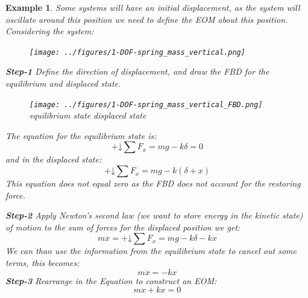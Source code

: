 \documentclass[12pt,letter]{article}
\newtheorem{ex}{Example}
\numberwithin{ex}{section} %
\newenvironment{example}{\begin{mdframed}[middlelinewidth=0.5mm]\begin{ex}\normalfont}{\end{ex}\end{mdframed}}
\numberwithin{re}{section} %
\numberwithin{vcs}{section} %
\newcommand*\downplus{%
  \mathbin{+\mathord\downarrow}}								%
\begin{document}
		\begin{example}	
			Some systems will have an initial displacement, as the system will oscillate around this position we need to define the EOM about this position. Considering the system:
			\begin{figure}[H]
				\centering
				\texttt{[image: ../figures/1-DOF-spring\_mass\_vertical.png]}
			\end{figure}		
			\noindent \textbf{Step-1}
			Define the direction of displacement, and draw the FBD for the equilibrium and displaced state.  
			\begin{figure}[H]
				\centering
				\texttt{[image: ../figures/1-DOF-spring\_mass\_vertical\_FBD.png]}\\
				equilibrium state \hspace{3cm} displaced state
			\end{figure}		
			\noindent The equation for the equilibrium state is:
			\begin{equation}
				\downplus \sum F_x = mg - k\delta = 0
			\end{equation}
			and in the displaced state:
			\begin{equation}
				\downplus \sum F_x =mg -k(\delta + x)
			\end{equation}	
			This equation does not equal zero as the FBD does not account for the restoring force.	
			
			\noindent \textbf{Step-2} Apply Newton's second law (we want to store energy in the kinetic state) of motion to the sum of forces for the displaced position we get: 		
			\begin{equation}
				m\ddot{x} = \downplus \sum F_x =mg -k\delta -kx
			\end{equation}
			We can than use the information from the equilibrium state to cancel out some terms, this becomes:
			\begin{equation}
				m\ddot{x} = -kx
			\end{equation}				
			\textbf{Step-3} Rearrange in the Equation to construct an EOM: 					
			\begin{equation}
				m\ddot{x} + kx = 0
			\end{equation}			
		\end{example}		
\end{document}
